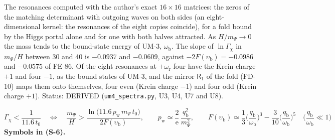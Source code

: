 \documentclass[
  10pt,
]{article}
\begin{document}
The resonances computed with the author's exact \(16 \times 16\)
matrices: the zeros of the matching determinant with outgoing waves on
both sides (an eight-dimensional kernel: the resonances of the eight
copies coincide), for a fold bound by the Higgs portal alone and for one
with both halves attracted. As \(H/m_\Psi \to 0\) the mass tends to the
bound-state energy of UM-3, \(\omega_{\mathrm{b}}\). The slope of
\(\ln\Gamma_\chi\) in \(m_\Psi/H\) between 30 and 40 is \(-0.0937\) and
\(-0.0609\), against \(-2F(\upsilon_{\mathrm{b}}) = -0.0986\) and
\(-0.0575\) of FE-86. Of the eight resonances at
\(+\omega_{\mathrm{r}}\) four have the Krein charge \(+1\) and four
\(-1\), as the bound states of UM-3, and the mirror \(\mathsf{R}_1\) of
the fold (FD-10) maps them onto themselves, four even (Krein charge
\(-1\)) and four odd (Krein charge \(+1\)). Status: DERIVED
(\texttt{um4\_spectra.py}, U3, U4, U7 and U8).

\[
\Gamma_\chi < \frac{1}{11.6\,t_0}\quad\Leftrightarrow\quad
\frac{m_\Psi}{H} > \frac{\ln\big(11.6\,p_{\mathrm{w}}\,m_\Psi\,t_0\big)}{2F(\upsilon_{\mathrm{b}})},\qquad
p_{\mathrm{w}} \simeq \frac{2}{\mathrm{e}}\,\frac{q_{\mathrm{b}}^2}{m_\Psi^2},\qquad
F(\upsilon_{\mathrm{b}}) \simeq \frac13\Big(\frac{q_{\mathrm{b}}}{\omega_{\mathrm{b}}}\Big)^3 - \frac{3}{10}\Big(\frac{q_{\mathrm{b}}}{\omega_{\mathrm{b}}}\Big)^5\quad
\Big(\frac{q_{\mathrm{b}}}{\omega_{\mathrm{b}}} \ll 1\Big) \tag{S-6}
\] \textbf{Symbols in (S-6).}
\end{document}
